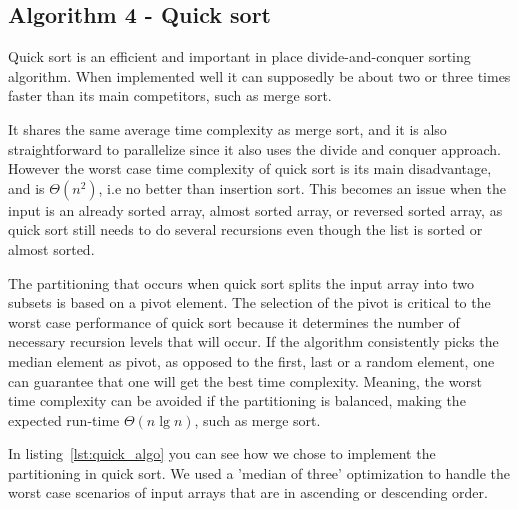 \documentclass[sigconf, nonacm, natbib, screen, balance=False]{acmart}
\begin{document}
\subsection{Algorithm 4 - Quick sort}\label{sec:algo4}

Quick sort is an efficient and important in place divide-and-conquer sorting algorithm. When implemented well it can supposedly be about two or three times faster than its main competitors, such as merge sort.

It shares the same average time complexity as merge sort, and it is also straightforward to parallelize since it also uses the divide and conquer approach. However the worst case time complexity of quick sort is its main disadvantage, and is $\Theta(n^2)$, i.e no better than insertion sort. This becomes an issue when the input is  an already sorted array, almost sorted array, or reversed sorted array, as quick sort still needs to do several recursions even though the list is sorted or almost sorted. 

The partitioning that occurs when quick sort splits the input array into two subsets is based on a pivot element. The selection of the pivot is critical to the worst case performance of quick sort because it determines the number of necessary recursion levels that will occur. If the algorithm consistently picks the median element as pivot, as opposed to the first, last or a random element, one can guarantee that one will get the best time complexity. Meaning, the worst time complexity can be avoided if the partitioning is balanced, making the expected run-time $\Theta(n\lg n)$, such as merge sort.

In listing~\ref{lst:quick_algo} you can see how we chose to implement the partitioning in quick sort. We used a 'median of three' optimization to handle the worst case scenarios of input arrays that are in ascending or descending order. 
\end{document}
